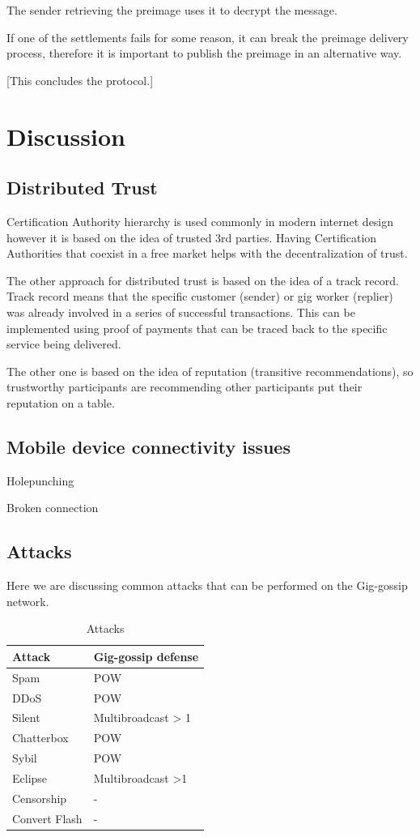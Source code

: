 \documentclass{article}
\begin{document}
The sender retrieving the preimage uses it to decrypt the message.

If one of the settlements fails for some reason, it can break the preimage delivery process, therefore it is important to publish the preimage in an alternative way.

[This concludes the protocol.]

\section{Discussion}

\subsection{Distributed Trust}

Certification Authority hierarchy is used commonly in modern internet design however it is based on the idea of trusted 3rd parties. Having Certification Authorities that coexist in a free market helps with the decentralization of trust.

The other approach for distributed trust is based on the idea of a track record. Track record means that the specific customer (sender) or gig worker (replier) was already involved in a series of successful transactions. This can be implemented using proof of payments that can be traced back to the specific service being delivered.

The other one is based on the idea of reputation (transitive recommendations), so trustworthy participants are recommending other participants put their reputation on a table.

\subsection{Mobile device connectivity issues}


Holepunching \cite{HolePunching}

Broken connection

\subsection{Attacks}
Here we are discussing common attacks that can be performed on the Gig-gossip network.


\begin{table}  
	\centering
	\begin{tabular}{ll}
		\toprule
		Attack         & Gig-gossip defense \\
		\midrule
		Spam           & POW \\
		DDoS           & POW \\
		Silent         & Multibroadcast > 1 \\
		Chatterbox     & POW \\
		Sybil          & POW \\
		Eclipse        & Multibroadcast >1 \\
		Censorship     & - \\
		Convert Flash  & - \\
		\bottomrule
	\end{tabular}
	\label{tab:attacks}
	\caption{Attacks}
\end{table}
\end{document}
